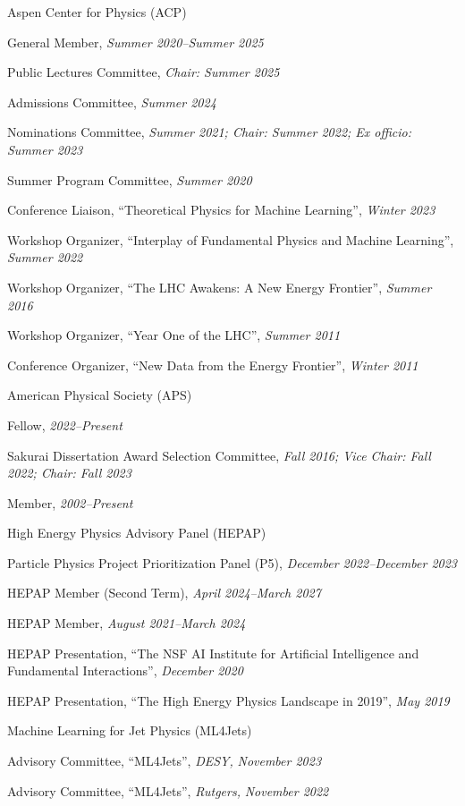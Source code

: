 \item Aspen Center for Physics (ACP)
\bsbl 
\item General Member, \emph{Summer 2020--Summer 2025}
\item Public Lectures Committee, \emph{Chair: Summer 2025}
\item Admissions Committee, \emph{Summer 2024}
\item Nominations Committee, \emph{Summer 2021; Chair: Summer 2022; Ex officio: Summer 2023}
\item Summer Program Committee, \emph{Summer 2020}
\item Conference Liaison, ``Theoretical Physics for Machine Learning'', \emph{Winter 2023}
\item Workshop Organizer, ``Interplay of Fundamental Physics and Machine Learning'', \emph{Summer 2022}
\item Workshop Organizer, ``The LHC Awakens: A New Energy Frontier'', \emph{Summer 2016}
\item Workshop Organizer, ``Year One of the LHC'', \emph{Summer 2011}
\item Conference Organizer, ``New Data from the Energy Frontier'', \emph{Winter 2011}
\el 
\item American Physical Society (APS)
\bsbl 
\item Fellow, \emph{2022--Present}
\item Sakurai Dissertation Award Selection Committee, \emph{Fall 2016; Vice Chair: Fall 2022; Chair: Fall 2023}
\item Member, \emph{2002--Present}
\el 
\item High Energy Physics Advisory Panel (HEPAP)
\bsbl 
\item Particle Physics Project Prioritization Panel (P5), \emph{December 2022--December 2023}
\item HEPAP Member (Second Term), \emph{April 2024--March 2027}
\item HEPAP Member, \emph{August 2021--March 2024}
\item HEPAP Presentation, ``The NSF AI Institute for Artificial Intelligence and Fundamental Interactions'', \emph{December 2020}
\item HEPAP Presentation, ``The High Energy Physics Landscape in 2019'', \emph{May 2019}
\el 
\item Machine Learning for Jet Physics (ML4Jets)
\bsbl 
\item Advisory Committee, ``ML4Jets'', \emph{DESY, }\emph{November 2023}
\item Advisory Committee, ``ML4Jets'', \emph{Rutgers, }\emph{November 2022}
